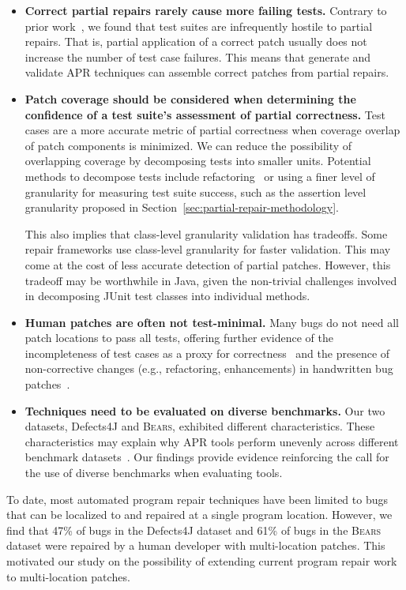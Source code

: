 \documentclass[10pt, conference]{IEEEtran}
\newcommand\bears{\textsc{Bears}\xspace}
\begin{document}
\begin{itemize}[wide, labelindent=0pt]
\item\textbf{Correct partial repairs rarely cause more failing tests.}
Contrary to prior work~\cite{gecco09}, we found that test suites are infrequently
hostile to partial repairs. That is, partial application of a correct patch
usually does not increase the number of test case failures. This means that
generate and validate APR techniques can assemble correct patches from partial repairs.

\item\textbf{Patch coverage should be considered when determining the
  confidence of a test suite's assessment of partial correctness.}
Test cases are a more accurate metric of partial correctness when coverage
overlap of patch components is minimized.
We can reduce the possibility of overlapping coverage by decomposing tests into
smaller units. Potential methods to decompose tests include
refactoring~\cite{b-refactoring} or using a finer level of granularity for
measuring test suite success, such as the assertion level granularity proposed
in Section~\ref{sec:partial-repair-methodology}.

This also implies that class-level granularity validation has tradeoffs. Some
repair frameworks use class-level granularity for faster validation. This may
come at the cost of less accurate detection of partial patches. However, this
tradeoff may be worthwhile in Java, given the non-trivial challenges involved in
decomposing JUnit test classes into individual methods.

\item\textbf{Human patches are often not test-minimal.}
Many bugs do not need all patch locations to pass all tests,
offering further evidence of the incompleteness of test cases as a
proxy for correctness~\cite{patch-correctness} and the
presence of non-corrective changes (e.g., refactoring, enhancements)
in handwritten bug patches~\cite{api-refactoring, tangledchanges}.

\item\textbf{Techniques need to be evaluated on diverse benchmarks.}
Our two datasets, Defects4J and \bears, exhibited different characteristics.
These characteristics may explain why APR tools perform unevenly across
different benchmark datasets~\cite{durieux-repair-them-all}. Our findings
provide evidence reinforcing the call for the use of diverse benchmarks when
evaluating tools.
\end{itemize}

To date, most automated program repair techniques have been limited to bugs that
can be localized to and repaired at a single program location. However, we find
that 47\% of bugs in the Defects4J dataset and 61\% of bugs in the \bears dataset
were repaired by a human developer with multi-location patches. This motivated
our study on the possibility of extending current program repair work to
multi-location patches.
\end{document}
